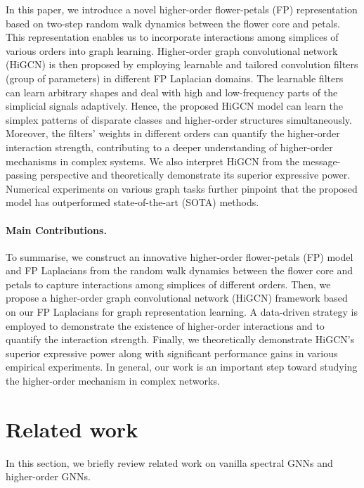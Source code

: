 \documentclass[letterpaper]{article} \usepackage{aaai24}
\theoremstyle{plain}
\theoremstyle{definition}
\theoremstyle{remark}
\begin{document}
In this paper, we introduce a novel higher-order flower-petals (FP) representation based on two-step random walk dynamics between the flower core and petals.
This representation enables us to incorporate interactions among simplices of various orders into graph learning.
Higher-order graph convolutional network (HiGCN) is then proposed by employing learnable and tailored convolution filters (group of parameters) in different FP Laplacian domains. 
The learnable filters can learn arbitrary shapes and deal with high and low-frequency parts of the simplicial signals adaptively. 
Hence, the proposed HiGCN model can learn the simplex patterns of disparate classes and higher-order structures simultaneously. 
Moreover, the filters' weights in different orders can quantify the higher-order interaction strength, contributing to a deeper understanding of higher-order mechanisms in complex systems.
We also interpret HiGCN from the message-passing perspective and theoretically demonstrate its superior expressive power. Numerical experiments on various graph tasks further pinpoint that the proposed model has outperformed state-of-the-art (SOTA) methods.






\paragraph{Main Contributions.} To summarise, we construct an innovative higher-order flower-petals (FP) model and FP Laplacians from the random walk dynamics between the flower core and petals to capture interactions among simplices of different orders. Then, we propose a higher-order graph convolutional network (HiGCN) framework based on our FP Laplacians for graph representation learning. A data-driven strategy is employed to demonstrate the existence of higher-order interactions and to quantify the interaction strength. Finally, we theoretically demonstrate HiGCN's superior expressive power along with significant performance gains in various empirical experiments. In general, our work is an important step toward studying the higher-order mechanism in complex networks.

\section{Related work}

In this section, we briefly review related work on vanilla spectral GNNs and higher-order GNNs.
\end{document}
